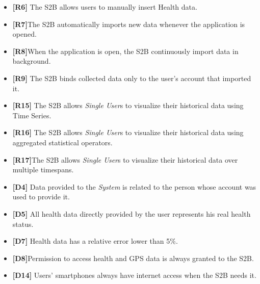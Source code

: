 \documentclass[titlepage]{article}
\begin{document}
\begin{itemize}
					 \begin{itemize} %
					 	\item {\bf [R6]} The S2B allows users to manually insert Health data.
\item {\bf [R7]}The S2B automatically imports new data whenever the application is opened.
\item {\bf [R8]}When the application is open, the S2B continuously import data in background.
\item {\bf [R9]} The S2B binds collected data only to the user’s account that imported it. 
\item {\bf [R15]} The S2B allows {\it Single User}s to visualize their historical data using Time Series. 
\item {\bf [R16]} The S2B allows {\it Single User}s to visualize their historical data using aggregated statistical operators. 
\item {\bf [R17]}The S2B allows {\it Single User}s to visualize their historical data over multiple timespans.
\item {\bf [D4]} Data provided to the {\it System} is related to the person whose account was used to provide it.
\item {\bf [D5]} All health data directly provided by the user represents his real health status.
\item {\bf [D7]} Health data has a relative error lower than 5\%.
\item {\bf [D8]}Permission to access health and GPS data is always granted to the S2B. 
\item {\bf [D14]} Users’ smartphones always have internet access when the S2B needs it.


\end{itemize}
\end{itemize}
\end{document}
